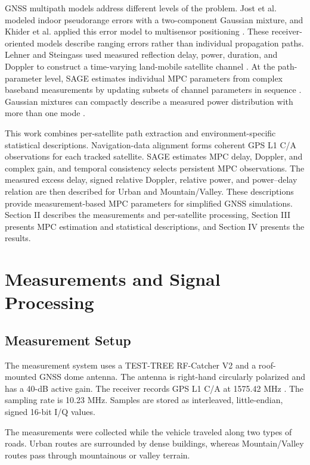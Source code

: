 \documentclass[conference]{IEEEtran}
\begin{document}
GNSS multipath models address different levels of the problem. Jost et al. modeled indoor pseudorange errors with a two-component Gaussian mixture, and Khider et al. applied this error model to multisensor positioning \cite{jost2010pseudorange,khider2013pseudorange}. These receiver-oriented models describe ranging errors rather than individual propagation paths. Lehner and Steingass used measured reflection delay, power, duration, and Doppler to construct a time-varying land-mobile satellite channel \cite{lehner2005lms}. At the path-parameter level, SAGE estimates individual MPC parameters from complex baseband measurements by updating subsets of channel parameters in sequence \cite{fessler1994sage,fleury1999sage}. Gaussian mixtures can compactly describe a measured power distribution with more than one mode \cite{selim2016mog}.

This work combines per-satellite path extraction and environment-specific statistical descriptions. Navigation-data alignment forms coherent GPS L1 C/A observations for each tracked satellite. SAGE estimates MPC delay, Doppler, and complex gain, and temporal consistency selects persistent MPC observations. The measured excess delay, signed relative Doppler, relative power, and power--delay relation are then described for Urban and Mountain/Valley. These descriptions provide measurement-based MPC parameters for simplified GNSS simulations. Section II describes the measurements and per-satellite processing, Section III presents MPC estimation and statistical descriptions, and Section IV presents the results.

\section{Measurements and Signal Processing}
\subsection{Measurement Setup}
The measurement system uses a TEST-TREE RF-Catcher V2 and a roof-mounted GNSS dome antenna. The antenna is right-hand circularly polarized and has a 40-dB active gain. The receiver records GPS L1 C/A at 1575.42 MHz \cite{gpsis200n2022}. The sampling rate is 10.23 MHz. Samples are stored as interleaved, little-endian, signed 16-bit I/Q values.

The measurements were collected while the vehicle traveled along two types of roads. Urban routes are surrounded by dense buildings, whereas Mountain/Valley routes pass through mountainous or valley terrain.
\end{document}
